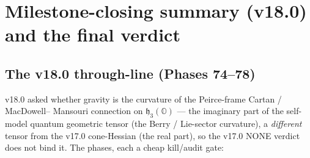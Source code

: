 \documentclass[11pt]{article}
\newcommand{\OO}{\mathbb{O}}
\newcommand{\hh}{\mathfrak{h}}
\theoremstyle{definition}\newtheorem{remark}{Remark}
\theoremstyle{definition}\newtheorem{definition}{Definition}
\theoremstyle{plain}\newtheorem{proposition}{Proposition}
\theoremstyle{plain}\newtheorem{lemma}{Lemma}
\begin{document}
\section{Milestone-closing summary (v18.0) and the final verdict}

\subsection{The v18.0 through-line (Phases 74--78)}
v18.0 asked whether gravity is the curvature of the Peirce-frame Cartan / MacDowell--
Mansouri connection on $\hh_3(\OO)$ --- the imaginary part of the self-model quantum
geometric tensor (the Berry / Lie-sector curvature), a \emph{different} tensor from the
v17.0 cone-Hessian (the real part), so the v17.0 NONE verdict does not bind it. The
phases, each a cheap kill/audit gate:
\end{document}
